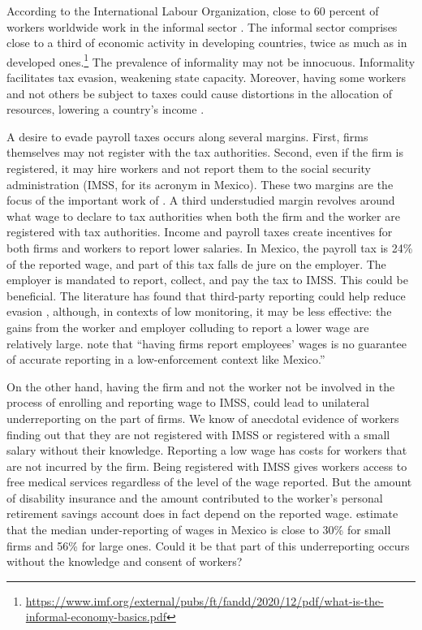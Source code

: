 \documentclass[oneside,11pt]{article}
\begin{document}
According to the International Labour Organization, close to 60 percent of workers worldwide work in the informal sector \citep{ILO_2018}. The informal sector comprises close to a third of economic activity in developing countries, twice as much as in developed ones.\footnote{\url{https://www.imf.org/external/pubs/ft/fandd/2020/12/pdf/what-is-the-informal-economy-basics.pdf}} The prevalence of informality may not be innocuous. Informality facilitates tax evasion, weakening state capacity. Moreover, having some workers and not others be subject to taxes could cause distortions in the allocation of resources, lowering a country's income \citep{Misallocation}. 

A desire to evade payroll taxes occurs along several margins. First, firms themselves may not register with the tax authorities. Second, even if the firm is registered, it may hire workers and not report them to the social security administration (IMSS, for its acronym in Mexico).%
These two margins are the focus of the important work of \cite{Ulyssea}. A third understudied margin revolves around what wage to declare to tax authorities when both the firm and the worker are registered with tax authorities. Income and payroll taxes create incentives for both firms and workers to report lower salaries. In Mexico, the payroll tax is 24\% of the reported wage, and part of this tax falls de jure on the employer. The employer is mandated to report, collect, and pay the tax to IMSS. This could be beneficial. The literature has found that third-party reporting could help reduce evasion \citep{Denmark}, although, in contexts of low monitoring, it may be less effective: the gains from the worker and employer colluding to report a lower wage are relatively large. \cite{kumler2020enlisting} note that ``having firms report employees’ wages is no guarantee of accurate reporting in a low-enforcement context like Mexico.'' %

On the other hand, having the firm and not the worker not be involved in the process of enrolling and reporting wage to IMSS, could lead to unilateral underreporting on the part of firms. We know of anecdotal evidence of workers finding out that they are not registered with IMSS or registered with a small salary without their knowledge. Reporting a low wage has costs for workers that are not incurred by the firm. Being registered with IMSS gives workers access to free medical services regardless of the level of the wage reported. But the amount of disability insurance and the amount contributed to the worker's personal retirement savings account does in fact depend on the reported wage. \cite{kumler2020enlisting} estimate that the median under-reporting of wages in Mexico is close to 30\% for small firms and 56\% for large ones. Could it be that part of this underreporting occurs without the knowledge and consent of workers? 
\end{document}
